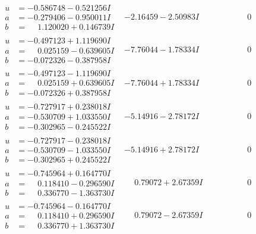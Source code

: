 \documentclass[1p]{elsarticle_modified}
\theoremstyle{definition}
\begin{document}
$$\begin{array}{c|c|c}
\begin{aligned}
u &= -0.586748 - 0.521256 I \\
a &= -0.279406 - 0.950011 I \\
b &= \phantom{-}1.120020 + 0.146739 I\end{aligned}
 & -2.16459 - 2.50983 I & \phantom{-0.000000 } 0 \\ \hline\begin{aligned}
u &= -0.497123 + 1.119690 I \\
a &= \phantom{-}0.025159 - 0.639605 I \\
b &= -0.072326 - 0.387958 I\end{aligned}
 & -7.76044 - 1.78334 I & \phantom{-0.000000 } 0 \\ \hline\begin{aligned}
u &= -0.497123 - 1.119690 I \\
a &= \phantom{-}0.025159 + 0.639605 I \\
b &= -0.072326 + 0.387958 I\end{aligned}
 & -7.76044 + 1.78334 I & \phantom{-0.000000 } 0 \\ \hline\begin{aligned}
u &= -0.727917 + 0.238018 I \\
a &= -0.530709 + 1.033550 I \\
b &= -0.302965 - 0.245522 I\end{aligned}
 & -5.14916 - 2.78172 I & \phantom{-0.000000 } 0 \\ \hline\begin{aligned}
u &= -0.727917 - 0.238018 I \\
a &= -0.530709 - 1.033550 I \\
b &= -0.302965 + 0.245522 I\end{aligned}
 & -5.14916 + 2.78172 I & \phantom{-0.000000 } 0 \\ \hline\begin{aligned}
u &= -0.745964 + 0.164770 I \\
a &= \phantom{-}0.118410 - 0.296590 I \\
b &= \phantom{-}0.336770 - 1.363730 I\end{aligned}
 & \phantom{-}0.79072 + 2.67359 I & \phantom{-0.000000 } 0 \\ \hline\begin{aligned}
u &= -0.745964 - 0.164770 I \\
a &= \phantom{-}0.118410 + 0.296590 I \\
b &= \phantom{-}0.336770 + 1.363730 I\end{aligned}
 & \phantom{-}0.79072 - 2.67359 I & \phantom{-0.000000 } 0 \\ \hline\begin{aligned}

\end{aligned}
\end{array}$$
\end{document}
